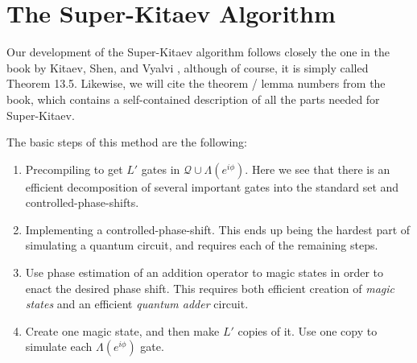 \section{The Super-Kitaev Algorithm}

Our development of the Super-Kitaev algorithm follows closely the one in the
book by Kitaev, Shen, and Vyalvi \cite{ksv02}, although of course, it is
simply called Theorem 13.5. Likewise, we will cite the theorem / lemma numbers
from the book, which contains a self-contained description of all the parts
needed for Super-Kitaev.

The basic steps of this method are the following:

\begin{enumerate}
\item Precompiling to get $L'$ gates in $\mathcal{Q} \cup \Lambda(e^{i\phi})$.
Here we see that there is an
efficient decomposition of several important gates into the standard set and
controlled-phase-shifts.
\item Implementing a controlled-phase-shift. This ends up being the hardest
part of simulating a quantum circuit, and requires each of the remaining steps.
\item Use phase estimation of an addition operator to magic states in order to
enact the desired phase shift. This requires both efficient creation of
{\em magic states} and an efficient {\em quantum adder} circuit.
\item Create one magic state, and then make $L'$ copies of it. Use one copy
to simulate each $\Lambda(e^{i\phi})$ gate.
\end{enumerate}
